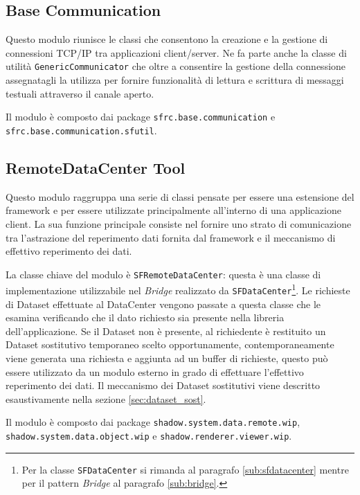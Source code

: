 
\subsection{Base Communication}
\label{sub:basecommodule}
Questo modulo riunisce le classi che consentono la creazione e la gestione di connessioni TCP/IP tra applicazioni client/server. Ne fa parte anche la classe di utilità \texttt{GenericCommunicator} che oltre a consentire la gestione della connessione assegnatagli la utilizza per fornire funzionalità di lettura e scrittura di messaggi testuali attraverso il canale aperto.

Il modulo è composto dai package \texttt{sfrc.base.communication} e \\\texttt{sfrc.base.communication.sfutil}.

\subsection{RemoteDataCenter Tool}
\label{sub:remotedatacentertoolmodule}
Questo modulo raggruppa una serie di classi pensate per essere una estensione del framework e per essere utilizzate principalmente all'interno di una applicazione client.
La sua funzione principale consiste nel fornire uno strato di comunicazione tra l'astrazione del reperimento dati fornita dal framework e il meccanismo di effettivo reperimento dei dati.

La classe chiave del modulo è \texttt{SFRemoteDataCenter}: questa è una classe di implementazione utilizzabile nel \textit{Bridge} realizzato da \texttt{SFDataCenter}\footnote{Per la classe \texttt{SFDataCenter} si rimanda al paragrafo \ref{sub:sfdatacenter} mentre per il pattern \textit{Bridge} al paragrafo \ref{sub:bridge}.}.
Le richieste di Dataset effettuate al DataCenter vengono passate a questa classe che le esamina verificando che il dato richiesto sia presente nella libreria dell'applicazione. Se il Dataset non è presente, al richiedente è restituito un Dataset sostitutivo temporaneo scelto opportunamente, contemporaneamente viene generata una richiesta e aggiunta ad un buffer di richieste, questo può essere utilizzato da un modulo esterno in grado di effettuare l'effettivo reperimento dei dati.
Il meccanismo dei Dataset sostitutivi viene descritto esaustivamente nella sezione \ref{sec:dataset_sost}.

Il modulo è composto dai package \texttt{shadow.system.data.remote.wip}, \texttt{shadow.system.data.object.wip} e \texttt{shadow.renderer.viewer.wip}.

